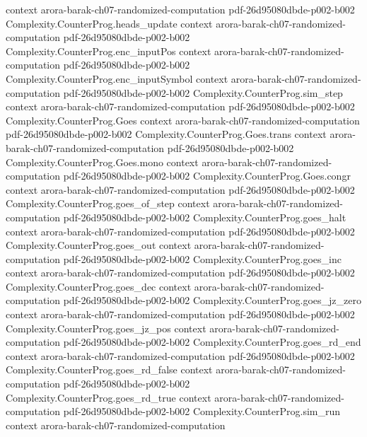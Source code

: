 \begin{theorem}
  {context}
  {arora-barak-ch07-randomized-computation}
  {pdf-26d95080dbde-p002-b002}
\proofstep
  {Complexity.CounterProg.heads_update}
  {context}
  {arora-barak-ch07-randomized-computation}
  {pdf-26d95080dbde-p002-b002}
\proofstep
  {Complexity.CounterProg.enc_inputPos}
  {context}
  {arora-barak-ch07-randomized-computation}
  {pdf-26d95080dbde-p002-b002}
\proofstep
  {Complexity.CounterProg.enc_inputSymbol}
  {context}
  {arora-barak-ch07-randomized-computation}
  {pdf-26d95080dbde-p002-b002}
\proofstep
  {Complexity.CounterProg.sim_step}
  {context}
  {arora-barak-ch07-randomized-computation}
  {pdf-26d95080dbde-p002-b002}
\proofstep
  {Complexity.CounterProg.Goes}
  {context}
  {arora-barak-ch07-randomized-computation}
  {pdf-26d95080dbde-p002-b002}
\proofstep
  {Complexity.CounterProg.Goes.trans}
  {context}
  {arora-barak-ch07-randomized-computation}
  {pdf-26d95080dbde-p002-b002}
\proofstep
  {Complexity.CounterProg.Goes.mono}
  {context}
  {arora-barak-ch07-randomized-computation}
  {pdf-26d95080dbde-p002-b002}
\proofstep
  {Complexity.CounterProg.Goes.congr}
  {context}
  {arora-barak-ch07-randomized-computation}
  {pdf-26d95080dbde-p002-b002}
\proofstep
  {Complexity.CounterProg.goes_of_step}
  {context}
  {arora-barak-ch07-randomized-computation}
  {pdf-26d95080dbde-p002-b002}
\proofstep
  {Complexity.CounterProg.goes_halt}
  {context}
  {arora-barak-ch07-randomized-computation}
  {pdf-26d95080dbde-p002-b002}
\proofstep
  {Complexity.CounterProg.goes_out}
  {context}
  {arora-barak-ch07-randomized-computation}
  {pdf-26d95080dbde-p002-b002}
\proofstep
  {Complexity.CounterProg.goes_inc}
  {context}
  {arora-barak-ch07-randomized-computation}
  {pdf-26d95080dbde-p002-b002}
\proofstep
  {Complexity.CounterProg.goes_dec}
  {context}
  {arora-barak-ch07-randomized-computation}
  {pdf-26d95080dbde-p002-b002}
\proofstep
  {Complexity.CounterProg.goes_jz_zero}
  {context}
  {arora-barak-ch07-randomized-computation}
  {pdf-26d95080dbde-p002-b002}
\proofstep
  {Complexity.CounterProg.goes_jz_pos}
  {context}
  {arora-barak-ch07-randomized-computation}
  {pdf-26d95080dbde-p002-b002}
\proofstep
  {Complexity.CounterProg.goes_rd_end}
  {context}
  {arora-barak-ch07-randomized-computation}
  {pdf-26d95080dbde-p002-b002}
\proofstep
  {Complexity.CounterProg.goes_rd_false}
  {context}
  {arora-barak-ch07-randomized-computation}
  {pdf-26d95080dbde-p002-b002}
\proofstep
  {Complexity.CounterProg.goes_rd_true}
  {context}
  {arora-barak-ch07-randomized-computation}
  {pdf-26d95080dbde-p002-b002}
\proofstep
  {Complexity.CounterProg.sim_run}
  {context}
  {arora-barak-ch07-randomized-computation}

\end{theorem}

